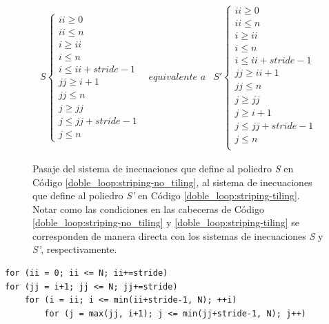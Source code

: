 \documentclass{article}
\begin{document}
\begin{figure}
\begin{displaymath}
	\begin{array}{rrr}
		S\begin{cases}
			ii\geq 0\\
			ii\leq n\\
			i\geq ii\\
			i\leq n\\
			i\leq ii+stride-1\\
			jj\geq i+1\\
			jj\leq n\\
			j\geq jj\\
			j\leq jj+stride-1\\
			j\leq n
		\end{cases}
		&
		\textit{equivalente a}
		&
		S'\begin{cases}
			ii\geq 0\\
			ii\leq n\\
			i\geq ii\\
			i\leq n\\
			i\leq ii+stride-1\\
			jj\geq ii+1\\
			jj\leq n\\
			j\geq jj\\
			j\geq i+1\\
			j\leq jj+stride-1\\
			j\leq n\\
		\end{cases}
	\end{array}
\end{displaymath}
	\caption{Pasaje del sistema de inecuaciones que define al poliedro \textit{S} en Código \ref{doble_loop:striping-no_tiling},
	al sistema de inecuaciones que define al poliedro \textit{S'} en Código \ref{doble_loop:striping-tiling}. Notar
	como las condiciones en las cabeceras de Código \ref{doble_loop:striping-no_tiling} y \ref{doble_loop:striping-tiling} se corresponden
	de manera directa con los sistemas de inecuaciones \textit{S} y \textit{S'}, respectivamente.}
	\label{fig:fourier_motzkin}
\end{figure}

\begin{lstlisting}[style=CStyle,label=doble_loop:striping-tiling,caption=doble loop con loop-tiling.]
for (ii = 0; ii <= N; ii+=stride)
for (jj = i+1; jj <= N; jj+=stride)
	for (i = ii; i <= min(ii+stride-1, N); ++i)
		for (j = max(jj, i+1); j <= min(jj+stride-1, N); j++)
\end{lstlisting}
\end{document}
